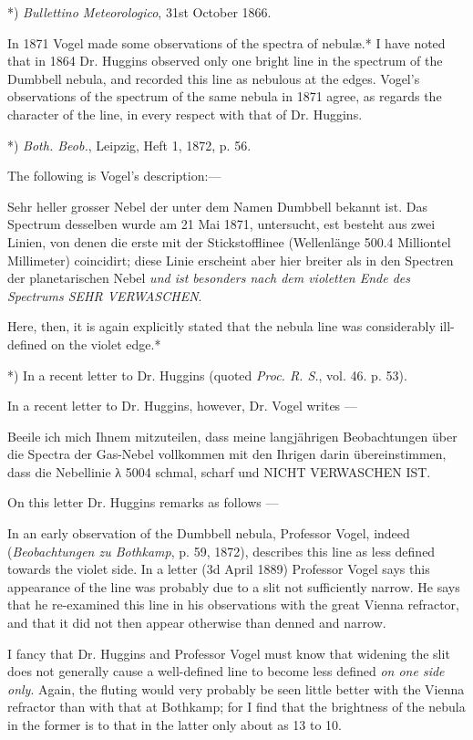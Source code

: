 \documentclass[a4paper, 12pt, oneside, polutonikogreek, english]{article}
\begin{document}
*) \emph{Bullettino Meteorologico}, 31st October 1866.

In 1871 Vogel made some observations of the spectra of nebulæ.* I have noted that in 1864 Dr. Huggins observed only one bright line in the spectrum of the Dumbbell nebula, and recorded this line as nebulous at the edges. Vogel's observations of the spectrum of the same nebula in 1871 agree, as regards the character of the line, in every respect with that of Dr. Huggins.

*) \emph{Both. Beob.}, Leipzig, Heft 1, 1872, p. 56.

The following is Vogel's description:---

Sehr heller grosser Nebel der unter dem Namen Dumbbell bekannt ist. Das Spectrum desselben wurde am 21 Mai 1871, untersucht, est besteht aus zwei Linien, von denen die erste mit der Stickstofflinee (Wellenlänge 500.4 Milliontel Millimeter) coincidirt; diese Linie erscheint aber hier breiter als in den Spectren der planetarischen Nebel \emph{und ist besonders nach dem violetten Ende des Spectrums SEHR VERWASCHEN}.

Here, then, it is again explicitly stated that the nebula line was considerably ill-defined on the violet edge.*

*) In a recent letter to Dr. Huggins (quoted \emph{Proc. R. S.}, vol. 46. p. 53).

In a recent letter to Dr. Huggins, however, Dr. Vogel writes ---

Beeile ich mich Ihnem mitzuteilen, dass meine langjährigen Beobachtungen über die Spectra der Gas-Nebel vollkommen mit den Ihrigen darin übereinstimmen, dass die Nebellinie λ 5004 schmal, scharf und NICHT VERWASCHEN IST.

On this letter Dr. Huggins remarks as follows ---

In an early observation of the Dumbbell nebula, Professor Vogel, indeed (\emph{Beobachtungen zu Bothkamp}, p. 59, 1872), describes this line as less defined towards the violet side. In a letter (3d April 1889) Professor Vogel says this appearance of the line was probably due to a slit not sufficiently narrow. He says that he re-examined this line in his observations with the great Vienna refractor, and that it did not then appear otherwise than denned and narrow.

I fancy that Dr. Huggins and Professor Vogel must know that widening the slit does not generally cause a well-defined line to become less defined \emph{on one side only}. Again, the fluting would very probably be seen little better with the Vienna refractor than with that at Bothkamp; for I find that the brightness of the nebula in the former is to that in the latter only about as 13 to 10.
\end{document}
